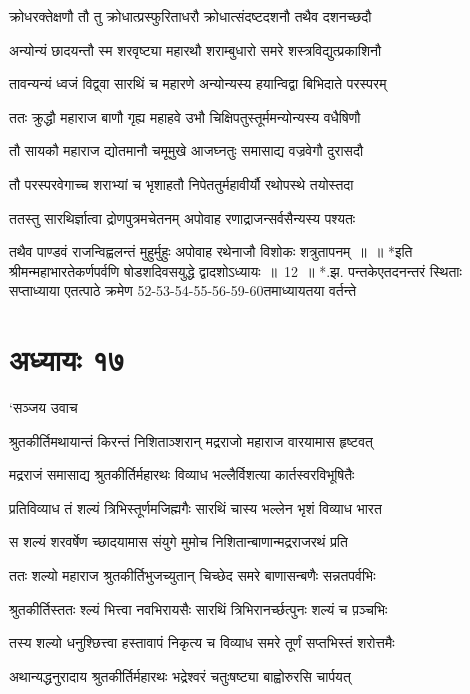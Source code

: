 \twolineshloka
{क्रोधरक्तेक्षणौ तौ तु क्रोधात्प्रस्फुरिताधरौ}
{क्रोधात्संदष्टदशनौ तथैव दशनच्छदौ}


\twolineshloka
{अन्योन्यं छादयन्तौ स्म शरवृष्ट्या महारथौ}
{शराम्बुधारो समरे शस्त्रविद्युत्प्रकाशिनौ}


\twolineshloka
{तावन्यन्यं ध्वजं विद्व्वा सारथिं च महारणे}
{अन्योन्यस्य हयान्विद्वा बिभिदाते परस्परम्}


\twolineshloka
{ततः क्रुद्धौ महाराज बाणौ गृह्य महाहवे}
{उभौ चिक्षिपतुस्तूर्ममन्योन्यस्य वधैषिणौ}


\twolineshloka
{तौ सायकौ महाराज द्योतमानौ चमूमुखे}
{आजघ्नतुः समासाद्य वज्रवेगौ दुरासदौ}


\twolineshloka
{तौ परस्परवेगाच्च शराभ्यां च भृशाहतौ}
{निपेततुर्महावीर्यौ रथोपस्थे तयोस्तदा}


\twolineshloka
{ततस्तु सारथिर्ज्ञात्वा द्रोणपुत्रमचेतनम्}
{अपोवाह रणाद्राजन्सर्वसैन्यस्य पश्यतः}


\threelineshloka
{तथैव पाण्डवं राजन्विह्वलन्तं मुहुर्मुहुः}
{अपोवाह रथेनाजौ विशोकः शत्रुतापनम् ॥ ॥ *इति श्रीमन्महाभारतेकर्णपर्वणि षोडशदिवसयुद्धे द्वादशोऽध्यायः ॥ 12 ॥ *.झ. पन्तकेएतदनन्तरं स्थिताः सप्ताध्याया एतत्पाठे क्रमेण 52-53-54-55-56-59-60तमाध्यायतया वर्तन्ते}
{}


\chapter{अध्यायः १७}
\twolineshloka
{`सञ्जय उवाच}
{}


\twolineshloka
{श्रुतकीर्तिमथायान्तं किरन्तं निशिताञ्शरान्}
{मद्रराजो महाराज वारयामास हृष्टवत्}


\twolineshloka
{मद्रराजं समासाद्य श्रुतकीर्तिर्महारथः}
{विव्याध भल्लैर्विशत्या कार्तस्वरविभूषितैः}


\twolineshloka
{प्रतिविव्याध तं शल्यं त्रिभिस्तूर्णमजिह्मगैः}
{सारथिं चास्य भल्लेन भृशं विव्याध भारत}


\twolineshloka
{स शल्यं शरवर्षेण च्छादयामास संयुगे}
{मुमोच निशितान्बाणान्मद्रराजरथं प्रति}


\twolineshloka
{ततः शल्यो महाराज श्रुतकीर्तिभुजच्युतान्}
{चिच्छेद समरे बाणासन्बणैः सन्नतपर्वभिः}


\twolineshloka
{श्रुतकीर्तिस्ततः श्ल्यं भित्त्वा नवभिरायसैः}
{सारथिं त्रिभिरानर्च्छत्पुनः शल्यं च प़ञ्चभिः}


\twolineshloka
{तस्य शल्यो धनुश्छित्त्वा हस्तावापं निकृत्य च}
{विव्याध समरे तूर्णं सप्तभिस्तं शरोत्तमैः}


\twolineshloka
{अथान्यद्धनुरादाय श्रुतकीर्तिर्महारथः}
{भद्रेश्वरं चतुःषष्ट्या बाह्वोरुरसि चार्पयत्}


